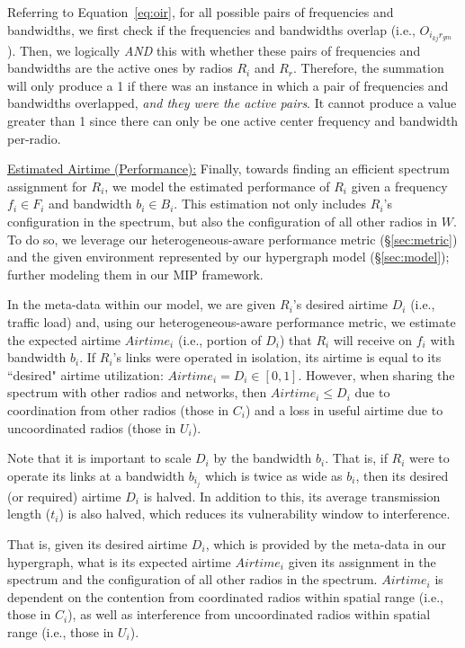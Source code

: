 Referring to Equation~\ref{eq:oir}, for all possible pairs of frequencies and bandwidths, we first check if the frequencies and bandwidths overlap (i.e., $O_{i_{kj}r_{gm}}$).  Then, we logically \emph{AND} this with whether these pairs of frequencies and bandwidths are the active ones by radios $R_i$ and $R_r$.  Therefore, the summation will only produce a 1 if there was an instance in which a pair of frequencies and bandwidths overlapped, \emph{and they were the active pairs}.  It cannot produce a value greater than 1 since there can only be one active center frequency and bandwidth per-radio.

\vspace{0.1in}
\uline{Estimated Airtime (Performance):}  Finally, towards finding an efficient spectrum assignment for $R_i$, we model the estimated performance of $R_i$ given a frequency $f_i \in F_i$ and bandwidth $b_i \in B_i$.  This estimation not only includes $R_i$'s configuration in the spectrum, but also the configuration of all other radios in $W$.  To do so, we leverage our heterogeneous-aware performance metric (\S\ref{sec:metric}) and the given environment represented by our hypergraph model (\S\ref{sec:model}); further modeling them in our MIP framework. 

In the meta-data within our model, we are given $R_i$'s desired airtime $D_i$  (i.e., traffic load) and, using our heterogeneous-aware performance metric, we estimate the expected airtime $Airtime_i$ (i.e., portion of $D_i$) that $R_i$ will receive on $f_i$ with bandwidth $b_i$.   If $R_i$'s links were operated in isolation, its airtime is equal to its ``desired" airtime utilization: $Airtime_i = D_i \in [0,1]$. However, when sharing the spectrum with other radios and networks, then $Airtime_i \leq D_i$ due to coordination from other radios (those in $C_i$) and a loss in useful airtime due to uncoordinated radios (those in $U_i$).  

Note that it is important to scale $D_i$ by the bandwidth $b_i$.  That is, if $R_i$ were to operate its links at a bandwidth $b_{i_j}$ which is twice as wide as $b_i$, then its desired (or required) airtime $D_i$ is halved.  In addition to this, its average transmission length ($t_i$) is also halved, which reduces its vulnerability window to interference.  

That is, given its desired airtime $D_i$, which is provided by the meta-data in our hypergraph, what is its expected airtime $Airtime_i$ given its assignment in the spectrum and the configuration of all other radios in the spectrum.  $Airtime_i$ is dependent on the contention from coordinated radios within spatial range (i.e., those in $C_i$), as well as interference from uncoordinated radios within spatial range (i.e., those in $U_i$). 


